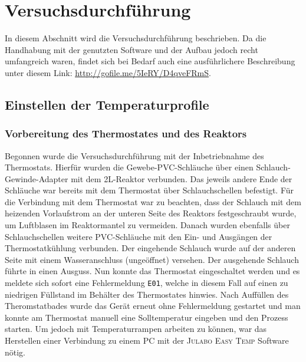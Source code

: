 \section{Versuchsdurchführung}
\label{sec:durchfuerung}
In diesem Abschnitt wird die Versuchsdurchführung beschrieben. Da die Handhabung mit der genutzten Software und der Aufbau jedoch recht umfangreich waren, findet sich bei Bedarf auch eine ausführlichere Beschreibung unter diesem Link: \underline{\url{http://gofile.me/5IeRY/D4qveFRmS}}.
\subsection{Einstellen der Temperaturprofile}
\subsubsection*{Vorbereitung des Thermostates und des Reaktors}
Begonnen wurde die Versuchsdurchführung mit der Inbetriebnahme des Thermostats. Hierfür wurden die Gewebe-PVC-Schläuche über einen Schlauch-Gewinde-Adapter mit dem 2L-Reaktor verbunden. Das jeweils andere Ende der Schläuche war bereits mit dem Thermostat über Schlauchschellen befestigt. Für die Verbindung mit dem Thermostat war zu beachten, dass der Schlauch mit dem heizenden Vorlaufstrom an der unteren Seite des Reaktors festgeschraubt wurde, um Luftblasen im Reaktormantel zu vermeiden. Danach wurden ebenfalls über Schlauchschellen weitere PVC-Schläuche mit den Ein- und Ausgängen der Thermostatkühlung verbunden. Der eingehende Schlauch wurde auf der anderen Seite mit einem Wasseranschluss (ungeöffnet) versehen. Der ausgehende Schlauch führte in einen Ausguss. Nun konnte das Thermostat eingeschaltet werden und es meldete sich sofort eine Fehlermeldung \texttt{E01}, welche in diesem Fall auf einen zu niedrigen Füllstand im Behälter des Thermostates hinwies. Nach Auffüllen des Theromstatbades wurde das Gerät erneut ohne Fehlermeldung gestartet und man konnte am Thermostat manuell eine Solltemperatur eingeben und den Prozess starten. Um jedoch mit Temperaturrampen arbeiten zu können, war das Herstellen einer Verbindung zu einem PC mit der \textsc{Julabo Easy Temp} Software nötig.

